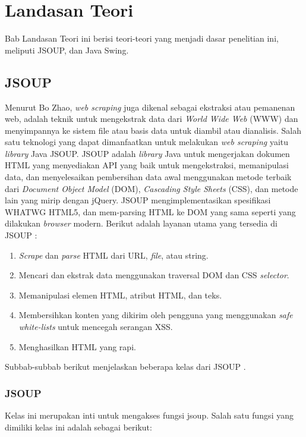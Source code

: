 \chapter{Landasan Teori}
\label{chap:teori}

Bab Landasan Teori ini berisi teori-teori yang menjadi dasar penelitian ini, meliputi JSOUP, dan Java Swing.

\section{JSOUP}
\label{sec:JSOUP} 
 
Menurut Bo Zhao\cite{zhao}, \textit{web scraping} juga dikenal sebagai ekstraksi atau pemanenan web, adalah teknik untuk mengekstrak data dari \textit{World Wide Web} (WWW) dan menyimpannya ke sistem file atau basis data untuk diambil atau dianalisis. Salah satu teknologi yang dapat dimanfaatkan untuk melakukan \textit{web scraping} yaitu \textit{library} Java JSOUP. JSOUP adalah \textit{library} Java untuk mengerjakan dokumen HTML yang menyediakan API yang baik untuk mengekstraksi, memanipulasi data, dan menyelesaikan pembersihan data awal menggunakan metode terbaik dari \textit{Document Object Model} (DOM), \textit{Cascading Style Sheets} (CSS), dan metode lain yang mirip dengan jQuery. JSOUP mengimplementasikan spesifikasi WHATWG HTML5, dan mem-parsing HTML ke DOM yang sama seperti yang dilakukan \textit{browser} modern. Berikut adalah layanan utama yang tersedia di JSOUP \cite{cokrowibowo}:
\begin{enumerate}
    \item \textit{Scrape} dan \textit{parse} HTML dari URL, \textit{file}, atau string.
    \item Mencari dan ekstrak data menggunakan traversal DOM dan CSS \textit{selector}.
    \item Memanipulasi elemen HTML, atribut HTML, dan teks.
    \item Membersihkan konten yang dikirim oleh pengguna yang menggunakan \textit{safe white-lists} untuk mencegah serangan XSS.
    \item Menghasilkan HTML yang rapi.
\end{enumerate}

Subbab-subbab berikut menjelaskan beberapa kelas dari JSOUP \cite{jsoup}.

\subsection{JSOUP}
Kelas ini merupakan inti untuk mengakses fungsi jsoup. Salah satu fungsi yang dimiliki kelas
ini adalah sebagai berikut:

